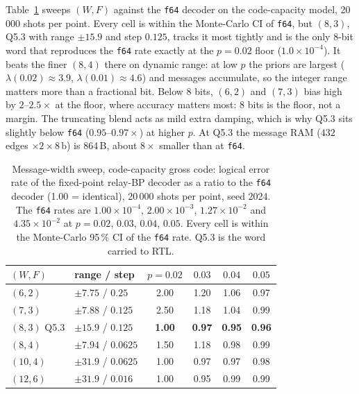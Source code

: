 Table~\ref{tab:width} sweeps $(W,F)$ against the \texttt{f64} decoder on the
code-capacity model, 20\,000 shots per point. Every cell is within the
Monte-Carlo CI of \texttt{f64}, but $(8,3)$, Q5.3 with range $\pm15.9$ and
step $0.125$, tracks it most tightly and is the only 8-bit word that
reproduces the \texttt{f64} rate exactly at the $p=0.02$ floor
($1.0\times10^{-4}$).
It beats the finer $(8,4)$ there on dynamic range: at low $p$ the priors are
largest ($\lambda(0.02)\approx3.9$, $\lambda(0.01)\approx4.6$) and messages
accumulate, so the integer range matters more than a fractional bit. Below 8
bits, $(6,2)$ and $(7,3)$ bias high by $2$--$2.5\times$ at the floor, where
accuracy matters most: 8 bits is the floor, not a margin. The truncating blend
acts as mild extra damping, which is why Q5.3 sits slightly below \texttt{f64}
($0.95$--$0.97\times$) at higher $p$.
At Q5.3 the message RAM ($432$ edges $\times2\times8$\,b) is 864\,B, about
$8\times$ smaller than at \texttt{f64}.

\begin{table}[t]
\centering
\caption{Message-width sweep, code-capacity gross code: logical error rate of
the fixed-point relay-BP decoder as a ratio to the \texttt{f64} decoder
(1.00 = identical), 20\,000 shots per point, seed 2024.
The \texttt{f64} rates are $1.00\times10^{-4}$, $2.00\times10^{-3}$,
$1.27\times10^{-2}$ and $4.35\times10^{-2}$ at $p=0.02$, $0.03$, $0.04$,
$0.05$. Every cell is within the Monte-Carlo 95\,\% CI of the \texttt{f64}
rate. Q5.3 is the word carried to RTL.}
\label{tab:width}
\small
\setlength{\tabcolsep}{4pt}
\begin{tabular}{@{}llcccc@{}}
\toprule
$(W,F)$ & range / step & $p{=}0.02$ & $0.03$ & $0.04$ & $0.05$ \\
\midrule
$(6,2)$  & $\pm7.75$ / $0.25$   & 2.00 & 1.20 & 1.06 & 0.97 \\
$(7,3)$  & $\pm7.88$ / $0.125$  & 2.50 & 1.18 & 1.04 & 0.99 \\
$(8,3)$ Q5.3 & $\pm15.9$ / $0.125$ & \textbf{1.00} & \textbf{0.97} & \textbf{0.95} & \textbf{0.96} \\
$(8,4)$  & $\pm7.94$ / $0.0625$ & 1.50 & 1.18 & 0.98 & 0.99 \\
$(10,4)$ & $\pm31.9$ / $0.0625$ & 1.00 & 0.97 & 0.97 & 0.98 \\
$(12,6)$ & $\pm31.9$ / $0.016$  & 1.00 & 0.95 & 0.99 & 0.99 \\
\bottomrule
\end{tabular}
\end{table}

